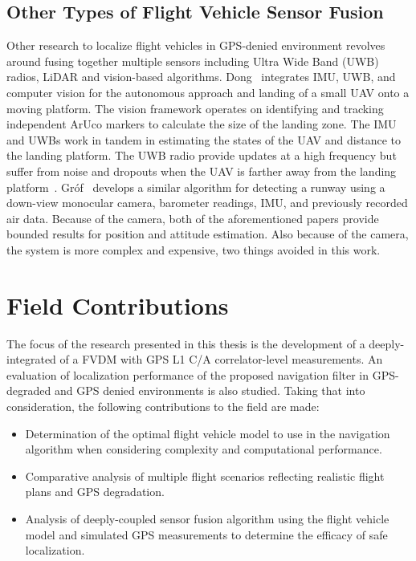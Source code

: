 \subsection{\textbf{Other Types of Flight Vehicle Sensor Fusion}}
Other research to localize flight vehicles in GPS-denied environment revolves around fusing together multiple sensors including Ultra Wide Band (UWB) radios, LiDAR and vision-based algorithms. Dong~\cite{dongIntegratedUWBIMUVisionFramework2022} integrates IMU, UWB, and computer vision for the autonomous approach and landing of a small UAV onto a moving platform. The vision framework operates on identifying and tracking independent ArUco markers to calculate the size of the landing zone. The IMU and UWBs work in tandem in estimating the states of the UAV and distance to the landing platform. The UWB radio provide updates at a high frequency but suffer from noise and dropouts when the UAV is farther away from the landing platform~\cite{dongIntegratedUWBIMUVisionFramework2022}. Gr\'of~\cite{grofPositioningAircraftRelative2022} develops a similar algorithm for detecting a runway using a down-view monocular camera, barometer readings, IMU, and previously recorded air data. Because of the camera, both of the aforementioned papers provide bounded results for position and attitude estimation. Also because of the camera, the system is more complex and expensive, two things avoided in this work.

\section{\textbf{Field Contributions}}
The focus of the research presented in this thesis is the development of a deeply-integrated of a FVDM with GPS L1 C/A correlator-level measurements. An evaluation of localization performance of the proposed navigation filter in GPS-degraded and GPS denied environments is also studied. Taking that into consideration, the following contributions to the field are made:
\begin{itemize}
    \item Determination of the optimal flight vehicle model to use in the navigation algorithm when considering complexity and computational performance.
    \item Comparative analysis of multiple flight scenarios reflecting realistic flight plans and GPS degradation.
    \item Analysis of deeply-coupled sensor fusion algorithm using the flight vehicle model and simulated GPS measurements to determine the efficacy of safe localization.
\end{itemize}

